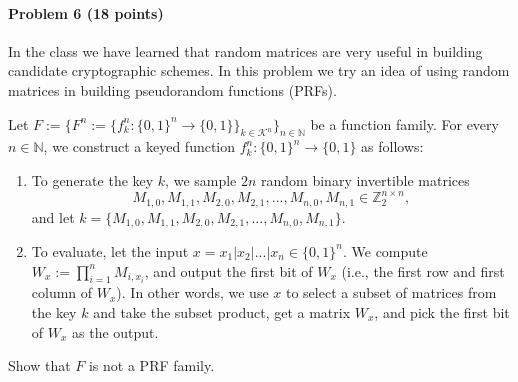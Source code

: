 \paragraph{Problem 6 (18 points)}
In the class we have learned that random matrices are very useful in building candidate cryptographic schemes. In this problem we try an idea of using random matrices in building pseudorandom functions (PRFs).

Let $F:=\{ F^n:= \{ f^n_k: \{0,1\}^n \to \{0,1\} \}_{k\in \mathcal{K}^n} \}_{n\in\mathbb{N}}$ be a function family. 
For every $n\in\mathbb{N}$, we construct a keyed function $f^n_k: \{0,1\}^n \to \{0,1\}$ as follows: 
\begin{enumerate}
\item To generate the key $k$, we sample $2n$ random binary invertible matrices 
\[ M_{1, 0}, M_{1, 1}, M_{2, 0}, M_{2, 1}, ..., M_{n, 0}, M_{n, 1} \in \mathbb{Z}_2^{n\times n},\] 
and let  $k = \{ M_{1, 0}, M_{1, 1}, M_{2, 0}, M_{2, 1}, ..., M_{n, 0}, M_{n, 1} \}$. 
\item To evaluate, let the input $x = x_1|x_2|...|x_n\in\{0,1\}^n$. We compute $W_x := \prod_{i = 1}^n M_{i, x_i}$, and output the first bit of $W_x$ (i.e., the first row and first column of $W_x$). In other words, we use $x$ to select a subset of matrices from the key $k$ and take the subset product, get a matrix $W_x$, and pick the first bit of $W_x$ as the output.
\end{enumerate}

Show that $F$ is not a PRF family. 